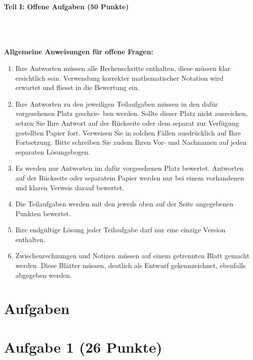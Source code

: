 \newcommand{\ein}[2]{(#1) (#2 Punkte)}
\newcommand{\frage}[2]{Frage #1 (#2 Punkte)}

\begin{Large}
\textbf{Teil I: Offene Aufgaben (50 Punkte)}
\end{Large}
\\
\\
\\
\textbf{Allgemeine Anweisungen für offene Fragen:}
\\
\renewcommand{\labelenumi}{(\roman{enumi})}
\begin{enumerate}
\item
Ihre Antworten müssen alle Rechenschritte enthalten,
diese müssen klar ersichtlich sein.
Verwendung korrekter mathematischer Notation wird erwartet
und fliesst in die Bewertung ein.

\item
Ihre Antworten zu den jeweiligen Teilaufgaben müssen in den dafür vorgesehenen Platz geschrie-
ben werden. Sollte dieser Platz nicht ausreichen, setzen Sie Ihre Antwort auf der Rückseite oder
dem separat zur Verfügung gestellten Papier fort. Verweisen Sie in solchen Fällen ausdrücklich
auf Ihre Fortsetzung. Bitte schreiben Sie zudem Ihren Vor- und Nachnamen auf jeden separaten
Lösungsbogen.

\item
Es werden nur Antworten im dafür vorgesehenen Platz bewertet. Antworten auf der Rückseite
oder separatem Papier werden nur bei einem vorhandenen und klaren Verweis darauf bewertet.

\item
Die Teilaufgaben werden mit den jeweils oben auf der Seite angegebenen Punkten bewertet.

\item
Ihre endgültige Lösung jeder Teilaufgabe darf nur eine einzige Version enthalten.

\item
Zwischenrechnungen und Notizen müssen auf einem getrennten Blatt gemacht werden. Diese
Blätter müssen, deutlich als Entwurf gekennzeichnet, ebenfalls abgegeben werden.
\end{enumerate}

\newpage
\section*{\hfil Aufgaben \hfil}
\vspace{1cm}
\section*{Aufgabe 1 (26 Punkte)}
\vspace{0.4cm}
